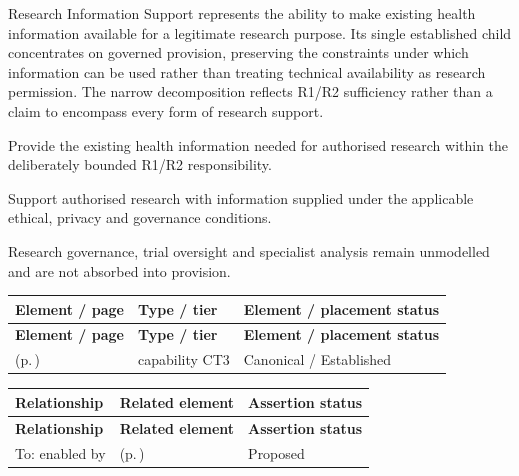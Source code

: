 Research Information Support represents the ability to make existing health information available for a legitimate research purpose. Its single established child concentrates on governed provision, preserving the constraints under which information can be used rather than treating technical availability as research permission. The narrow decomposition reflects R1/\allowbreak{}R2 sufficiency rather than a claim to encompass every form of research support.



Provide the existing health information needed for authorised research within the deliberately bounded R1/\allowbreak{}R2 responsibility.



Support authorised research with information supplied under the applicable ethical, privacy and governance conditions.



Research governance, trial oversight and specialist analysis remain unmodelled and are not absorbed into provision.


\begingroup\small\setlength{\TableWidth}{\dimexpr\linewidth-6\tabcolsep-4\arrayrulewidth\relax}
\begin{longtable}{|>{\raggedright\arraybackslash}p{0.52\TableWidth}|>{\raggedright\arraybackslash}p{0.2\TableWidth}|>{\raggedright\arraybackslash}p{0.28\TableWidth}|}
\hline\rowcolor{TableHead}\textbf{Element / page} & \textbf{Type / tier} & \textbf{Element / placement status}\\\hline\endfirsthead
\hline\rowcolor{TableHead}\textbf{Element / page} & \textbf{Type / tier} & \textbf{Element / placement status}\\\hline\endhead
\hline\endfoot
\nameref{cap:bc-governed-research-information-provision} (p.\,\pageref{cap:bc-governed-research-information-provision}) & capability CT3 & Canonical / Established\\\hline
\end{longtable}\endgroup

\begingroup\small\setlength{\TableWidth}{\dimexpr\linewidth-6\tabcolsep-4\arrayrulewidth\relax}
\begin{longtable}{|>{\raggedright\arraybackslash}p{0.27\TableWidth}|>{\raggedright\arraybackslash}p{0.48\TableWidth}|>{\raggedright\arraybackslash}p{0.25\TableWidth}|}
\hline\rowcolor{TableHead}\textbf{Relationship} & \textbf{Related element} & \textbf{Assertion status}\\\hline\endfirsthead
\hline\rowcolor{TableHead}\textbf{Relationship} & \textbf{Related element} & \textbf{Assertion status}\\\hline\endhead
\hline\endfoot
To: enabled by & \nameref{cap:bec-authorised-research-information-provision} (p.\,\pageref{cap:bec-authorised-research-information-provision}) & Proposed\\\hline
\end{longtable}\endgroup

